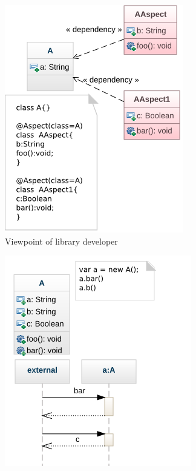 \begin{figure}[ht]
\begin{subfigure}[b]{0.45\textwidth}
\centering
\includegraphics[width=0.75\linewidth]{chapter2/fig/library-developer-view.png}
\caption{Viewpoint of library developer}\label{fig:library-view}
\end{subfigure}
\hspace{0.3cm}
\begin{subfigure}[b]{0.45\textwidth}
\centering
\includegraphics[width=0.75\linewidth]{chapter2/fig/user-view.png}

\end{subfigure}
\end{figure}
